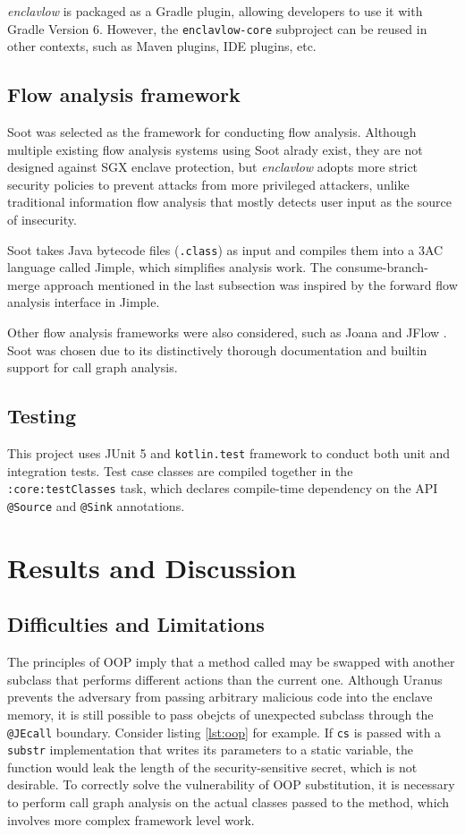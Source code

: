 \documentclass[a4paper, 12pt]{article}
\def\pname{\emph{enclavlow}}
\def\code#1{\colorbox{code}{\texttt{\footnotesize #1}}}
\begin{document}
\pname{} is packaged as a Gradle plugin,
allowing developers to use it with Gradle Version 6.
However, the \code{enclavlow-core} subproject can be reused in other contexts,
such as Maven plugins, IDE plugins, etc.

\subsection{Flow analysis framework}
Soot \cite{sootsurvivor} was selected as the framework for conducting flow analysis.
Although multiple existing flow analysis systems using Soot alrady exist,
they are not designed against SGX enclave protection,
but \pname{} adopts more strict security policies
to prevent attacks from more privileged attackers,
unlike traditional information flow analysis
that mostly detects user input as the source of insecurity.

Soot takes Java bytecode files (\code{*.class}) as input
and compiles them into a 3AC language called Jimple,
which simplifies analysis work.
The consume-branch-merge approach mentioned in the last subsection
was inspired by the forward flow analysis interface in Jimple.

Other flow analysis frameworks were also considered,
such as Joana \cite{joana} and JFlow \cite{jflow}.
Soot was chosen due to its distinctively thorough documentation
and builtin support for call graph analysis.

\subsection{Testing}
This project uses JUnit 5 and \code{kotlin.test} framework
to conduct both unit and integration tests.
Test case classes are compiled together in the \code{:core:testClasses} task,
which declares compile-time dependency on the API \code{@Source} and \code{@Sink} annotations.

\section{Results and Discussion}
\subsection{Difficulties and Limitations}
The principles of OOP imply that a method called may be swapped with another subclass
that performs different actions than the current one.
Although Uranus prevents the adversary
from passing arbitrary malicious code into the enclave memory,
it is still possible to pass obejcts of unexpected subclass
through the \code{@JEcall} boundary.
Consider listing \ref{lst:oop} for example.
If \code{cs} is passed with a \code{substr} implementation
that writes its parameters to a static variable,
the function would leak the length of the security-sensitive secret,
which is not desirable.
To correctly solve the vulnerability of OOP substitution,
it is necessary to perform call graph analysis on the actual classes passed to the method,
which involves more complex framework level work.
\end{document}
